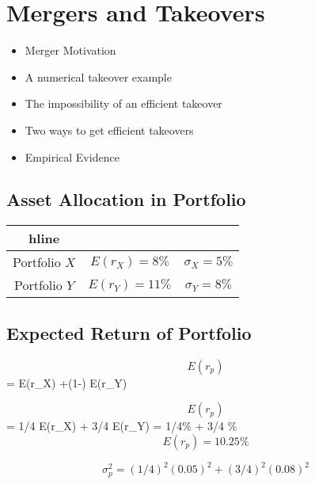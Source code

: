 

\section*{Mergers and Takeovers}

\begin{itemize}
\item Merger Motivation
\item A numerical takeover example
\item The impossibility of an efficient takeover
\item Two ways to get efficient takeovers
\item Empirical Evidence
\end{itemize}


\subsection*{Asset Allocation in Portfolio}
\begin{center}
\begin{tabular}{|c|c|c|}
\\hline
              &                  & \\ \hline
Portfolio $X$ & $E(r_X) = 8\%$  & $\sigma_X = 5\%$ \\ \hline
Portfolio $Y$ & $E(r_Y) = 11\%$  & $\sigma_Y = 8\%$  \\ \hline
\end{tabular}
\end{center}

\subsection*{Expected Return of Portfolio}
\[E(r_p)\] = \alpha E(r_X) +(1-\alpha) E(r_Y)\]

\[E(r_p)\] = 1/4 E(r_X) + 3/4 E(r_Y) = 1/4\% + 3/4 \%\]
\[ E(r_p) = 10.25\% \]

\[ \sigma^2_p = (1/4)^2(0.05)^2 + (3/4)^2(0.08)^2 \]
